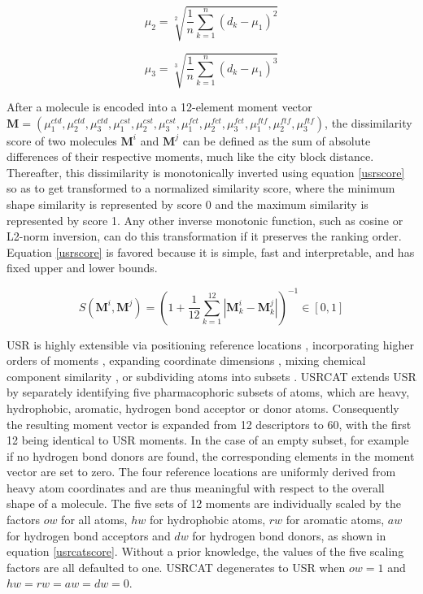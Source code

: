 \documentclass[a4,center,fleqn]{NAR}
\begin{document}
\begin{equation}
\mu_2=\sqrt[2]{\frac{1}{n}\sum_{k=1}^{n}{(d_k-\mu_1)^2}}
\label{moment2}
\end{equation}

\begin{equation}
\mu_3=\sqrt[3]{\frac{1}{n}\sum_{k=1}^{n}{(d_k-\mu_1)^3}}
\label{moment3}
\end{equation}

After a molecule is encoded into a 12-element moment vector $\mathbf M=(\mu_1^{ctd}, \mu_2^{ctd}, \mu_3^{ctd}, \mu_1^{cst}, \mu_2^{cst}, \mu_3^{cst}, \mu_1^{fct}, \mu_2^{fct}, \mu_3^{fct}, \mu_1^{ftf}, \mu_2^{ftf}, \mu_3^{ftf})$, the dissimilarity score of two molecules $\mathbf M^i$ and $\mathbf M^j$ can be defined as the sum of absolute differences of their respective moments, much like the city block distance. Thereafter, this dissimilarity is monotonically inverted using equation \eqref{usrscore} so as to get transformed to a normalized similarity score, where the minimum shape similarity is represented by score 0 and the maximum similarity is represented by score 1. Any other inverse monotonic function, such as cosine or L2-norm inversion, can do this transformation if it preserves the ranking order. Equation \eqref{usrscore} is favored because it is simple, fast and interpretable, and has fixed upper and lower bounds.

\begin{equation}
S(\mathbf M^i, \mathbf M^j)=(1+\frac{1}{12}\sum_{k=1}^{12}|\mathbf M_k^i-\mathbf M_k^j|)^{-1}\in[0, 1]
\label{usrscore}
\end{equation}

USR \cite{1379} is highly extensible via positioning reference locations \cite{1334,1335}, incorporating higher orders of moments \cite{1333,1337}, expanding coordinate dimensions \cite{1337,1338}, mixing chemical component similarity \cite{1333,1407,1408}, or subdividing atoms into subsets \cite{1436,1331}. USRCAT \cite{1331} extends USR \cite{1379} by separately identifying five pharmacophoric subsets of atoms, which are heavy, hydrophobic, aromatic, hydrogen bond acceptor or donor atoms. Consequently the resulting moment vector is expanded from 12 descriptors to 60, with the first 12 being identical to USR moments. In the case of an empty subset, for example if no hydrogen bond donors are found, the corresponding elements in the moment vector are set to zero. The four reference locations are uniformly derived from heavy atom coordinates and are thus meaningful with respect to the overall shape of a molecule. The five sets of 12 moments are individually scaled by the factors $ow$ for all atoms, $hw$ for hydrophobic atoms, $rw$ for aromatic atoms, $aw$ for hydrogen bond acceptors and $dw$ for hydrogen bond donors, as shown in equation \eqref{usrcatscore}. Without a prior knowledge, the values of the five scaling factors are all defaulted to one. USRCAT degenerates to USR when $ow=1$ and $hw=rw=aw=dw=0$.
\end{document}
